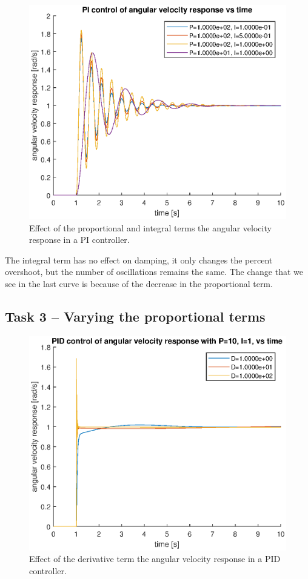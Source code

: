 \documentclass[12pt]{article}
\begin{document}
\begin{figure}
    \centering
    \includegraphics[width=\linewidth]{img/task02_varying_pi.eps}
    \caption{Effect of the proportional and integral terms the angular velocity response in a PI controller.}
    \label{fig:pi on angular velocity}
\end{figure}

The integral term has no effect on damping, it only changes the percent overshoot, but the number of oscillations remains the same. The change that we see in the last curve is because of the decrease in the proportional term.

\subsection{Task 3 -- Varying the proportional terms}

\begin{figure}
    \centering
    \includegraphics[width=\linewidth]{img/task03_varying_d.eps}
    \caption{Effect of the derivative term the angular velocity response in a PID controller.}
    \label{fig:d on angular velocity}
\end{figure}
\end{document}
